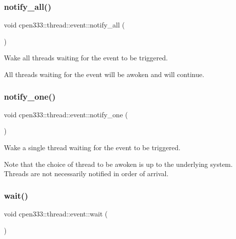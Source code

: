 \subsubsection{\texorpdfstring{notify\+\_\+all()}{notify\_all()}}
{\footnotesize\ttfamily void cpen333\+::thread\+::event\+::notify\+\_\+all (\begin{DoxyParamCaption}{ }\end{DoxyParamCaption})\hspace{0.3cm}{\ttfamily [inline]}}



Wake all threads waiting for the event to be triggered. 

All threads waiting for the event will be awoken and will continue. \mbox{\label{classcpen333_1_1thread_1_1event_a453552a68dff5c45321496e452495364}} 
\subsubsection{\texorpdfstring{notify\+\_\+one()}{notify\_one()}}
{\footnotesize\ttfamily void cpen333\+::thread\+::event\+::notify\+\_\+one (\begin{DoxyParamCaption}{ }\end{DoxyParamCaption})\hspace{0.3cm}{\ttfamily [inline]}}



Wake a single thread waiting for the event to be triggered. 

Note that the choice of thread to be awoken is up to the underlying system. Threads are not necessarily notified in order of arrival. \mbox{\label{classcpen333_1_1thread_1_1event_a041bc99b2749b269ac3853a4b8bba678}} 
\subsubsection{\texorpdfstring{wait()}{wait()}}
{\footnotesize\ttfamily void cpen333\+::thread\+::event\+::wait (\begin{DoxyParamCaption}{ }\end{DoxyParamCaption})\hspace{0.3cm}{\ttfamily [inline]}}



